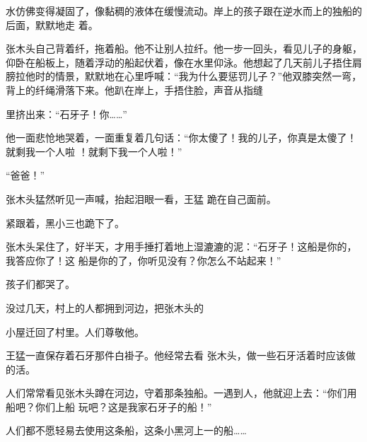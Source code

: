 \documentclass{article}
\begin{document}
水仿佛变得凝固了，像黏稠的液体在缓慢流动。岸上的孩子跟在逆水而上的独船的后面，默默地走
着。 

张木头自己背着纤，拖着船。他不让别人拉纤。他一步一回头，看见儿子的身躯，仰卧在船板上，随着浮动的船起伏着，像在水里仰泳。他想起了几天前儿子捂住肩膀拉他时的情景，默默地在心里呼喊：“我为什么要惩罚儿子？”他双膝突然一弯，背上的纤绳滑落下来。他趴在岸上，手捂住脸，声音从指缝

\newpage
里挤出来：“石牙子！你……” 

他一面悲怆地哭着，一面重复着几句话：“你太傻了！我的儿子，你真是太傻了！就剩我一个人啦
！就剩下我一个人啦！” 


“爸爸！” 

张木头猛然听见一声喊，抬起泪眼一看，王猛
跪在自己面前。 



紧跟着，黑小三也跪下了。 

张木头呆住了，好半天，才用手捶打着地上湿漉漉的泥：“石牙子！这船是你的，我答应你了！这
船是你的了，你听见没有？你怎么不站起来！” 


孩子们都哭了。 

没过几天，村上的人都拥到河边，把张木头的

\newpage
小屋迁回了村里。人们尊敬他。 

王猛一直保存着石牙那件白褂子。他经常去看
张木头，做一些石牙活着时应该做的活。 

人们常常看见张木头蹲在河边，守着那条独船。一遇到人，他就迎上去：“你们用船吧？你们上船
玩吧？这是我家石牙子的船！” 

人们都不愿轻易去使用这条船，这条小黑河上一的船……
\end{document}
